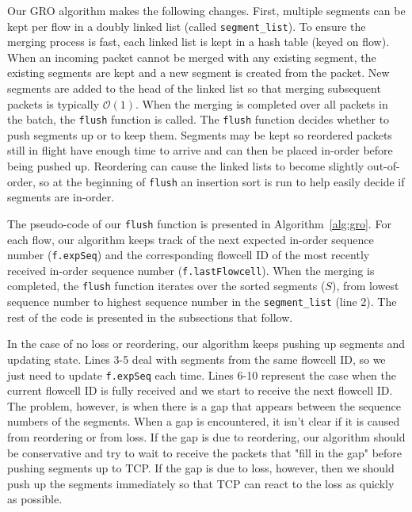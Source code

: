 Our GRO algorithm makes the following changes. First, multiple segments can be
kept per flow in a doubly linked list (called {\tt segment\_list}). 
To ensure the merging process is fast, each linked list is kept in a hash table (keyed on flow).
When an incoming packet cannot be merged with any existing segment, the existing
segments are kept and a new segment is created from the packet.
New segments are added to the head of the linked list so that merging subsequent packets is typically $\mathcal{O}(1)$.
When the merging is completed over all packets in the batch, the {\tt flush} function is called. 
The {\tt flush} function decides whether to push segments up or to keep them. Segments may 
be kept so reordered packets still in flight have enough time to arrive and can then be placed in-order
before being pushed up. 
Reordering can cause the linked lists to become slightly out-of-order, so
at the beginning of {\tt flush} an insertion sort is run to help easily decide if segments are in-order.

The pseudo-code of our {\tt flush} function is presented in Algorithm~\ref{alg:gro}.
For each flow, our algorithm keeps track of the next expected in-order
sequence number ({\tt f.expSeq}) and the corresponding flowcell ID
of the most recently received in-order sequence number ({\tt f.lastFlowcell}).
When the merging is completed, the {\tt flush} function iterates over 
the sorted segments ($S$), from lowest sequence number to highest sequence number in the {\tt segment\_list} (line 2).
The rest of the code is presented in the subsections that follow.


In the case of no loss or reordering, our algorithm keeps pushing up segments and updating state. Lines 3-5
deal with segments from the same flowcell ID, so we just need to update {\tt f.expSeq} each time. Lines 
6-10 represent the case when the current flowcell ID is fully received and we start to receive the
next flowcell ID.
The problem, however, is when there is 
a gap that appears between the sequence numbers of the segments. When a gap is encountered,
it isn't clear if it is caused from reordering or from loss. If the gap is due to reordering,
our algorithm should be conservative and try to wait to receive the packets that "fill in the gap" 
before pushing segments up to TCP. If the gap is due to loss, however, then we should push up the 
segments immediately so that TCP can react to the loss as quickly as possible.

